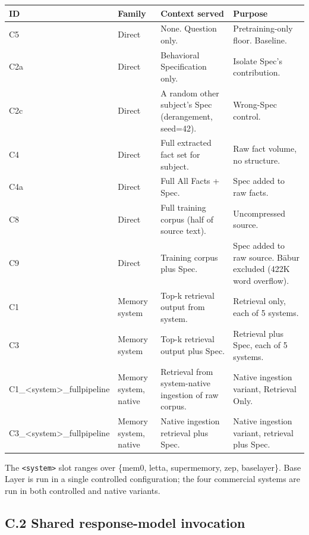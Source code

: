 \begin{longtable}[]{@{}
  >{\raggedright\arraybackslash}p{}
  >{\raggedright\arraybackslash}p{}
  >{\raggedright\arraybackslash}p{}
  >{\raggedright\arraybackslash}p{}@{}}
\toprule
ID & Family & Context served & Purpose \\
\midrule
\endhead
C5 & Direct & None. Question only. & Pretraining-only floor.
Baseline. \\
C2a & Direct & Behavioral Specification only. & Isolate Spec's
contribution. \\
C2c & Direct & A random other subject's Spec (derangement, seed=42). &
Wrong-Spec control. \\
C4 & Direct & Full extracted fact set for subject. & Raw fact volume, no
structure. \\
C4a & Direct & Full All Facts + Spec. & Spec added to raw facts. \\
C8 & Direct & Full training corpus (half of source text). & Uncompressed
source. \\
C9 & Direct & Training corpus plus Spec. & Spec added to raw source.
Bābur excluded (422K word overflow). \\
C1 & Memory system & Top-k retrieval output from system. & Retrieval
only, each of 5 systems. \\
C3 & Memory system & Top-k retrieval output plus Spec. & Retrieval plus
Spec, each of 5 systems. \\
C1\_\textless system\textgreater\_fullpipeline & Memory system, native &
Retrieval from system-native ingestion of raw corpus. & Native ingestion
variant, Retrieval Only. \\
C3\_\textless system\textgreater\_fullpipeline & Memory system, native &
Native ingestion retrieval plus Spec. & Native ingestion variant,
retrieval plus Spec. \\
\bottomrule
\end{longtable}

The \texttt{\textless{}system\textgreater{}} slot ranges over \{mem0,
letta, supermemory, zep, baselayer\}. Base Layer is run in a single
controlled configuration; the four commercial systems are run in both
controlled and native variants.

\hypertarget{c.2-shared-response-model-invocation}{%
\subsection{C.2 Shared response-model
invocation}\label{c.2-shared-response-model-invocation}}

